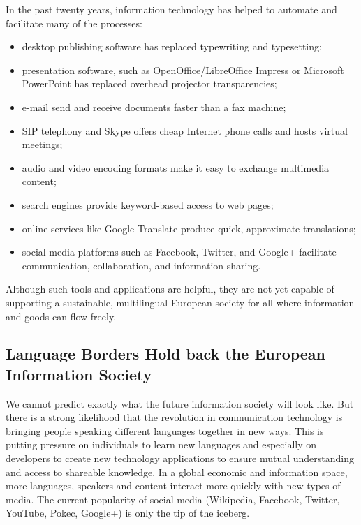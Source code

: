 \begin{multicols}{2}
In the past twenty years, information technology has helped to automate and facilitate many of the processes:

\begin{itemize}
\item desktop publishing software has replaced typewriting and typesetting;
\item presentation software, such as OpenOffice/LibreOffice Impress or Microsoft PowerPoint has replaced overhead projector transparencies;
\item e-mail send and receive documents faster than a fax machine;
\item SIP telephony and Skype offers cheap Internet phone calls and hosts virtual meetings;
\item audio and video encoding formats make it easy to exchange multimedia content;
\item search engines provide keyword-based access to web pages;
\item online services like Google Translate produce quick, approximate translations;
\item social media platforms such as Facebook, Twitter, and Google+ facilitate communication, collaboration, and information sharing.
\end{itemize}

Although such tools and applications are helpful, they are not yet capable of supporting a sustainable, multilingual European society for all where information and goods can flow freely.

\subsection{Language Borders Hold back the European Information Society}
We cannot predict exactly what the future information society will look like. But there is a strong likelihood that the revolution in communication technology is bringing people speaking different languages together in new ways. This is putting pressure on individuals to learn new languages and especially on developers to create new technology applications to ensure mutual understanding and access to shareable knowledge. In a global economic and information space, more languages, speakers and content interact more quickly with new types of media. The current popularity of social media (Wikipedia, Facebook, Twitter, YouTube, Pokec, Google+) is only the tip of the iceberg.



\end{multicols}
